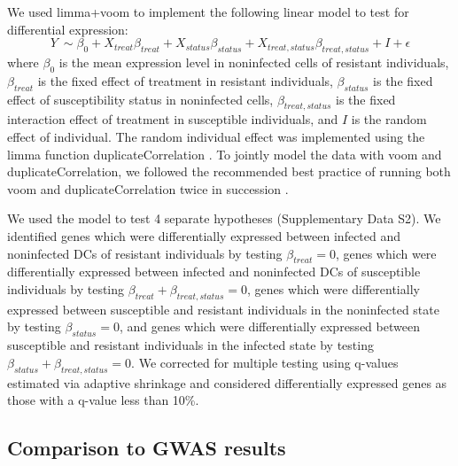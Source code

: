 \documentclass[fleqn,10pt]{wlscirep}
\begin{document}
We used limma+voom \cite{Smyth2004, Law2014, Ritchie2015} to implement
the following linear model to test for differential expression:
\begin{equation} \label{eq:limma}
Y\ \sim \beta_{0} + X_{treat}\beta_{treat} + X_{status}\beta_{status} + X_{treat,status}\beta_{treat,status} + I + \epsilon
\end{equation}
where $\beta_{0}$ is the mean expression level in noninfected cells of
resistant individuals, $\beta_{treat}$ is the fixed effect of
treatment in resistant individuals, $\beta_{status}$ is the fixed
effect of susceptibility status in noninfected cells,
$\beta_{treat,status}$ is the fixed interaction effect of treatment in
susceptible individuals, and $I$ is the random effect of individual.
The random individual effect was implemented using the limma function
duplicateCorrelation \cite{Smyth2005}. To jointly model the data with
voom and duplicateCorrelation, we followed the recommended best
practice of running both voom and duplicateCorrelation twice in
succession \cite{Liu2015}.

We used the model to test 4 separate hypotheses (Supplementary Data
S2). We identified genes which were differentially expressed between
infected and noninfected DCs of resistant individuals by testing
$\beta_{treat} = 0$, genes which were differentially expressed between
infected and noninfected DCs of susceptible individuals by testing
$\beta_{treat} + \beta_{treat,status} = 0$, genes which were
differentially expressed between susceptible and resistant individuals
in the noninfected state by testing $\beta_{status} = 0$, and genes
which were differentially expressed between susceptible and resistant
individuals in the infected state by testing $\beta_{status} +
\beta_{treat,status} = 0$. We corrected for multiple testing using
q-values estimated via adaptive shrinkage \cite{Stephens2016} and
considered differentially expressed genes as those with a q-value less
than 10\%.
\subsection*{Comparison to GWAS results}
\end{document}
